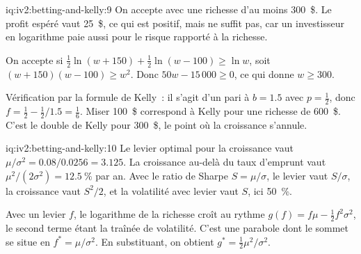 \begin{solution}{iq:iv2:betting-and-kelly:9}
On accepte avec une richesse d'au moins 300~\$. Le profit espéré vaut 25~\$, ce qui est positif, mais ne suffit pas, car un investisseur en logarithme paie aussi pour le risque rapporté à la richesse.

On accepte si $\tfrac12\ln(w + 150) + \tfrac12\ln(w - 100) \geq \ln w$, soit $(w + 150)(w - 100) \geq w^2$. Donc $50w - 15\,000 \geq 0$, ce qui donne $w \geq 300$.

Vérification par la formule de Kelly~: il s'agit d'un pari à $b = 1.5$ avec $p = \tfrac12$, donc $f = \tfrac12 - \tfrac12/1.5 = \tfrac16$. Miser 100~\$ correspond à Kelly pour une richesse de 600~\$. C'est le double de Kelly pour 300~\$, le point où la croissance s'annule.

\end{solution}

\begin{solution}{iq:iv2:betting-and-kelly:10}
Le levier optimal pour la croissance vaut $\mu/\sigma^2 = 0.08/0.0256 = 3.125$. La croissance au-delà du taux d'emprunt vaut $\mu^2/(2\sigma^2) = 12.5~\%$ par an. Avec le ratio de Sharpe $S = \mu/\sigma$, le levier vaut $S/\sigma$, la croissance vaut $S^2/2$, et la volatilité avec levier vaut $S$, ici 50~\%.

Avec un levier $f$, le logarithme de la richesse croît au rythme $g(f) = f\mu - \tfrac12 f^2\sigma^2$, le second terme étant la traînée de volatilité. C'est une parabole dont le sommet se situe en $f^* = \mu/\sigma^2$. En substituant, on obtient $g^* = \tfrac12\mu^2/\sigma^2$.

\end{solution}

